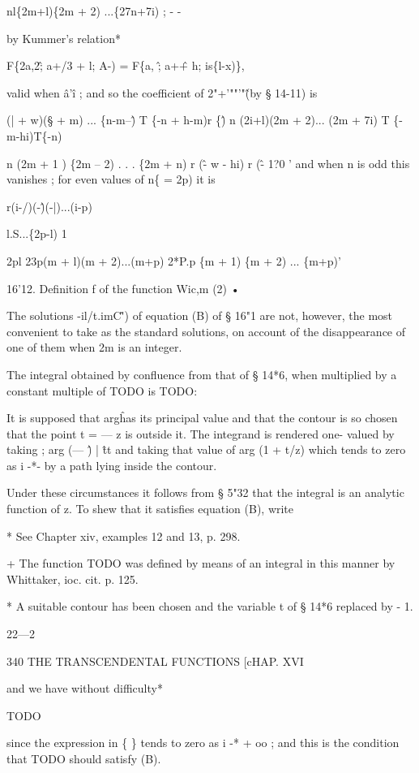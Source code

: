 nl\{2m+l)\{2m + 2) ...\{27n+7i) ; - -

by Kummer's relation*

F\{2a,2\^; a+/3 + l; A-) = F\{a, \^; a+\^ + h; is\{l-x)\},

valid when \^a'\^ i ; and so the coefficient of 2"+'""'"\^ (by §
14-11) is

(| + w)(§ + m) ... \{n-m--\^ ) T \{-n + h-m)r \{\^ ) n (2i+l)(2m +
2)... (2m + 7i) T \{-m-hi)T\{-n)

n (2m + 1 ) \{2m -- 2) . . . \{2m + n) r (\^ - w - hi) r (\^ - 1?0 '
and when n is odd this vanishes ; for even values of n\{ = 2p) it is

r(i-/)(-\^)(-|)...(i-p)

l.S...\{2p-l) 1

2pl 23p(m + l)(m + 2)...(m+p) 2*P.p \{m + 1) \{m + 2) ... \{m+p)'

16'12. Definition f of the function Wic,m (2) •

The solutions -il/t.imC\^') of equation (B) of § 16"1 are not,
however, the most convenient to take as the standard solutions, on
account of the disappearance of one of them when 2m is an integer.

The integral obtained by confluence from that of § 14*6, when
multiplied by a constant multiple of TODO is TODO:

It is supposed that arg\^ has its principal value and that the contour
is so chosen that the point t = — z is outside it. The integrand is
rendered one- valued by taking ; arg (— \^) | \^ tt and taking that
value of arg (1 + t/z) which tends to zero as i -*- by a path lying
inside the contour.

Under these circumstances it follows from § 5"32 that the integral is
an analytic function of z. To shew that it satisfies equation (B),
write

* See Chapter xiv, examples 12 and 13, p. 298.

+ The function TODO was defined by means of an integral in this manner
by Whittaker, ioc. cit. p. 125.

* A suitable contour has been chosen and the variable t of § 14*6
replaced by - 1.

22—2

340 THE TRANSCENDENTAL FUNCTIONS [cHAP. XVI

and we have without difficulty*

TODO

since the expression in \{ \} tends to zero as i -* + oo ; and this is
the condition that TODO should satisfy (B).


